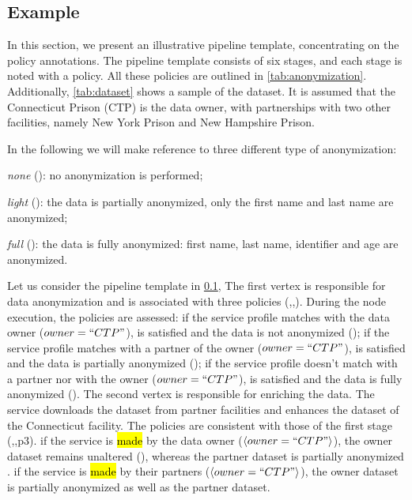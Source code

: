 \subsection{Example}\label{sec:example}

In this section, we present an illustrative pipeline template, concentrating on the policy annotations.
The pipeline template consists of six stages, and each stage is noted with a policy.
All these policies are outlined in \cref{tab:anonymization}.
Additionally, \cref{tab:dataset} shows a sample of the dataset.
It is assumed that the Connecticut Prison (CTP) is the data owner, with partnerships with two other facilities, namely New York Prison and
New Hampshire Prison.

In the following we will make reference to three different type of anonymization:
\begin{enumerate*}[label=\roman*)]
  \item \emph{none} (): no anonymization is performed;
  \item \emph{light} (): the data is partially anonymized, only the first name and last name are anonymized;
  \item \emph{full} (): the data is fully anonymized: first name, last name, identifier and age are anonymized.
\end{enumerate*}
Let us consider the pipeline template \tChartFunction in \cref{sec:example},
The first vertex is responsible for data anonymization and is associated with three policies (,,).
During the node execution, the policies are assessed:
if the service profile matches with the data owner ($owner = ``CTP"$),  is satisfied and the data is not anonymized ();
if the service profile matches with a partner of the owner ($owner = ``CTP"$),  is satisfied and the data is partially anonymized ();
if the service profile doesn't match with a partner nor with the owner ($owner = ``CTP"$),  is satisfied and the data is fully anonymized ().
The second vertex is responsible for enriching the data.
The service downloads the dataset from partner facilities and enhances the dataset of the Connecticut facility.
The policies are consistent with those of the first stage (,,p{3}).
if the service is \hl{made} by the data owner ($\langle owner = ``CTP" \rangle$), the owner dataset remains unaltered (), whereas the partner dataset is partially anonymized .
if the service is \hl{made} by their partners ($\langle owner = ``CTP" \rangle$), the owner dataset is partially anonymized as well as the partner dataset.

